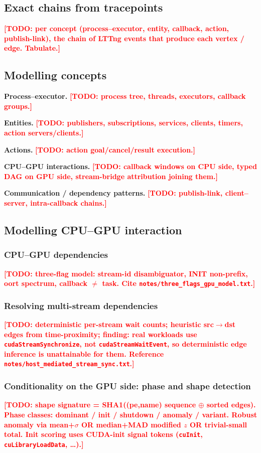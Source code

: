 \documentclass[conference]{IEEEtran}
\newcommand{\todoit}[1]{\textcolor{red}{\textbf{[TODO: #1]}}}
\begin{document}
\subsection{Exact chains from tracepoints}
\todoit{per concept (process--executor, entity, callback, action,
publish-link), the chain of LTTng events that produce each vertex / edge.
Tabulate.}

\subsection{Modelling concepts}
\textbf{Process--executor.} \todoit{process tree, threads, executors,
callback groups.}

\textbf{Entities.} \todoit{publishers, subscriptions, services,
clients, timers, action servers/clients.}

\textbf{Actions.} \todoit{action goal/cancel/result execution.}

\textbf{CPU--GPU interactions.} \todoit{callback windows on CPU side,
typed DAG on GPU side, stream-bridge attribution joining them.}

\textbf{Communication / dependency patterns.} \todoit{publish-link,
client--server, intra-callback chains.}

\subsection{Modelling CPU--GPU interaction}

\subsubsection{CPU--GPU dependencies}
\todoit{three-flag model: stream-id disambiguator, INIT non-prefix,
oort spectrum, callback $\neq$ task. Cite
\texttt{notes/three\_flags\_gpu\_model.txt}.}

\subsubsection{Resolving multi-stream dependencies}
\todoit{deterministic per-stream wait counts; heuristic src$\to$dst
edges from time-proximity; finding: real workloads use
\texttt{cudaStreamSynchronize}, not \texttt{cudaStreamWaitEvent}, so
deterministic edge inference is unattainable for them. Reference
\texttt{notes/host\_mediated\_stream\_sync.txt}.}

\subsubsection{Conditionality on the GPU side: phase and shape detection}
\todoit{shape signature = SHA1((pe,name) sequence $\oplus$ sorted edges).
Phase classes: dominant / init / shutdown / anomaly / variant. Robust
anomaly via mean+$\sigma$ OR median+MAD modified $z$ OR trivial-small
total. Init scoring uses CUDA-init signal tokens (\texttt{cuInit},
\texttt{cuLibraryLoadData}, \ldots).}
\end{document}

